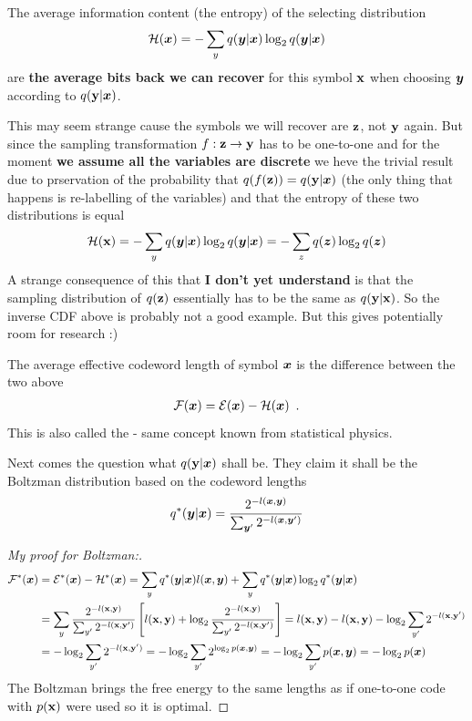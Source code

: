 The average information content (the entropy) of the selecting distribution
\begin{align}
\mathcal{H}({\bm{x}}) = - \sum_y q({\bm{y}} | {\bm{x}}) \log_2 q({\bm{y}} | {\bm{x}})
\end{align}
are \textbf{the average bits back we can recover} for this symbol ${\mathbf{x}}$ when choosing ${\bm{y}}$ according to $q({\mathbf{y}} | {\bm{x}})$.

\begin{notebox}
This may seem strange cause the symbols we will recover are ${\mathbf{z}}$, not ${\mathbf{y}}$ again.
But since the sampling transformation $f : {\mathbf{z}} \to {\mathbf{y}}$ has to be one-to-one and for the moment \textbf{we assume all the variables are discrete} we heve the trivial result due to prservation of the probability that $q(f({\mathbf{z}})) = q({\mathbf{y}} | {\bm{x}})$ (the only thing that happens is re-labelling of the variables) and that the entropy of these two distributions is equal
\begin{align}
\mathcal{H}({\mathbf{x}}) = - \sum_y q({\bm{y}} | {\bm{x}}) \log_2 q({\bm{y}} | {\bm{x}}) = - \sum_z q({\bm{z}}) \log_2 q({\bm{z}})
\end{align}
A strange consequence of this that \textbf{I don't yet understand} is that the sampling distribution of $q({\mathbf{z}})$ essentially has to be the same as $q({\mathbf{y}} | {\mathbf{x}})$.
So the inverse CDF above is probably not a good example.
But this gives potentially room for research :)
\end{notebox}

The average effective codeword length of symbol ${\bm{x}}$ is the difference between the two above
\begin{align}
\mathcal{F}({\bm{x}}) = \mathcal{E}({\bm{x}}) - \mathcal{H}({\bm{x}}) \enspace .
\end{align}
This is also called the \textbf{} - same concept known from statistical physics.

Next comes the question what $q({\mathbf{y}} | {\bm{x}})$ shall be.
They claim it shall be the Boltzman distribution based on the codeword lengths
\begin{align}
q^*({\bm{y}} | {\bm{x}}) = \frac{2^{-l({\bm{x}}, {\bm{y}})}}{\sum_{{\bm{y}}'} 2^{-l({\bm{x}}, {\bm{y}}')}}
\end{align}

\begin{proof}[My proof for Boltzman:]
\begin{align*}
\mathcal{F^*}({\bm{x}}) & = \mathcal{E^*}({\bm{x}}) - \mathcal{H^*}({\bm{x}})
= \sum_y q^*({\bm{y}} | {\bm{x}}) l({\bm{x}}, {\bm{y}}) + \sum_y q^*({\bm{y}} | {\bm{x}}) \log_2 q^*({\bm{y}} | {\bm{x}}) \\
& = \sum_y \frac{2^{-l({\mathbf{x}}, {\mathbf{y}})}}{\sum_{y'} 2^{-l({\mathbf{x}}, {\mathbf{y}}')}} \left[l({\mathbf{x}}, {\mathbf{y}}) + \log_2 \frac{2^{-l({\mathbf{x}}, {\mathbf{y}})}}{\sum_{y'} 2^{-l({\mathbf{x}}, {\mathbf{y}}')}}\right] 
= l({\mathbf{x}}, {\mathbf{y}}) - l({\mathbf{x}}, {\mathbf{y}}) - \log_2 \sum_{y'} 2^{-l({\mathbf{x}}, {\mathbf{y}}')} \\
& = - \log_2 \sum_{y'} 2^{-l({\mathbf{x}}, {\mathbf{y}}')} = 
- \log_2 \sum_{y'} 2^{\log_2 p({\bm{x}}, {\bm{y}})} =
- \log_2 \sum_{y'} p({\bm{x}}, {\bm{y}}) = - \log_2 p({\bm{x}})
\end{align*}
The Boltzman brings the free energy to the same lengths as if one-to-one code with $p({\mathbf{x}})$ were used so it is optimal.
\end{proof}

